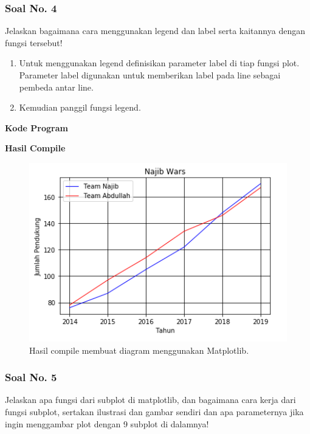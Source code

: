 \subsubsection{Soal No. 4}
\hfill \break
Jelaskan bagaimana cara menggunakan legend dan label serta kaitannya dengan fungsi tersebut!

\begin{enumerate}
	\item Untuk menggunakan legend definisikan parameter label di tiap fungsi plot. Parameter label digunakan untuk memberikan label pada line sebagai pembeda antar line.
	
	
	
	\item Kemudian panggil fungsi legend.
	
	
\end{enumerate}

\hfill \break
\textbf{Kode Program}



\hfill \break
\textbf{Hasil Compile}

\begin{figure}[H]
	\includegraphics[width=12cm]{figures/6/1174042/8.png}
	\centering
	\caption{Hasil compile membuat diagram menggunakan Matplotlib.}
\end{figure}

\subsubsection{Soal No. 5}
\hfill \break
Jelaskan apa fungsi dari subplot di matplotlib, dan bagaimana cara kerja dari fungsi subplot, sertakan ilustrasi dan gambar sendiri dan apa parameternya jika ingin menggambar plot dengan 9 subplot di dalamnya!

